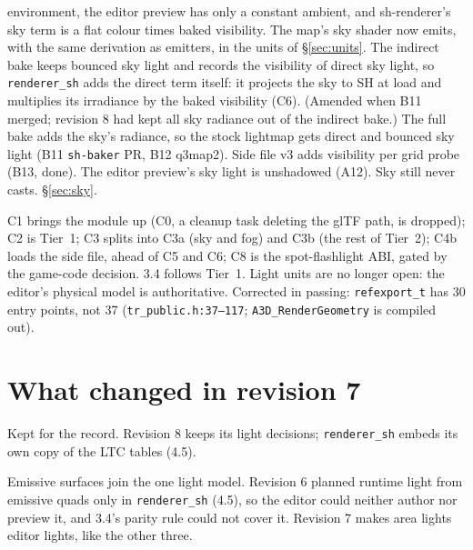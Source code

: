 \documentclass[11pt,a4paper]{article}
\begin{document}
\begin{description}[style=nextline]
  environment, the editor preview has only a constant ambient, and sh-renderer's sky term is a flat
  colour times baked visibility. The map's sky shader now emits, with the same derivation as
  emitters, in the units of §\ref{sec:units}. The indirect bake keeps bounced sky light and records the
  visibility of direct sky light, so \texttt{renderer\_sh} adds the direct term itself: it projects
  the sky to SH at load and multiplies its irradiance by the baked visibility (C6). (Amended when B11
  merged; revision 8 had kept all sky radiance out of the indirect bake.) The full bake adds the
  sky's radiance, so the stock lightmap gets direct and bounced sky light (B11 \texttt{sh-baker} PR,
  B12 q3map2). Side file v3 adds visibility per grid probe (B13, done). The editor preview's sky light is
  unshadowed (A12). Sky still never casts. §\ref{sec:sky}.
\item[Track C restructured.] C1 brings the module up (C0, a cleanup task deleting the glTF path,
  is dropped); C2 is
  Tier~1; C3 splits into C3a (sky and fog) and C3b (the rest of Tier~2); C4b loads the side file,
  ahead of C5 and C6; C8 is the spot-flashlight ABI, gated by the game-code decision. 3.4 follows
  Tier~1. Light units are no longer open: the editor's physical model is authoritative. Corrected
  in passing: \texttt{refexport\_t} has 30 entry points, not 37 (\texttt{tr\_public.h:37--117};
  \texttt{A3D\_RenderGeometry} is compiled out).
\end{description}

\section{What changed in revision 7}\label{sec:rev7}

Kept for the record. Revision 8 keeps its light decisions; \texttt{renderer\_sh} embeds its own
copy of the LTC tables (4.5).

Emissive surfaces join the one light model. Revision 6 planned runtime light from emissive quads
only in \texttt{renderer\_sh} (4.5), so the editor could neither author nor preview it, and 3.4's
parity rule could not cover it. Revision 7 makes area lights editor lights, like the other three.
\end{document}
